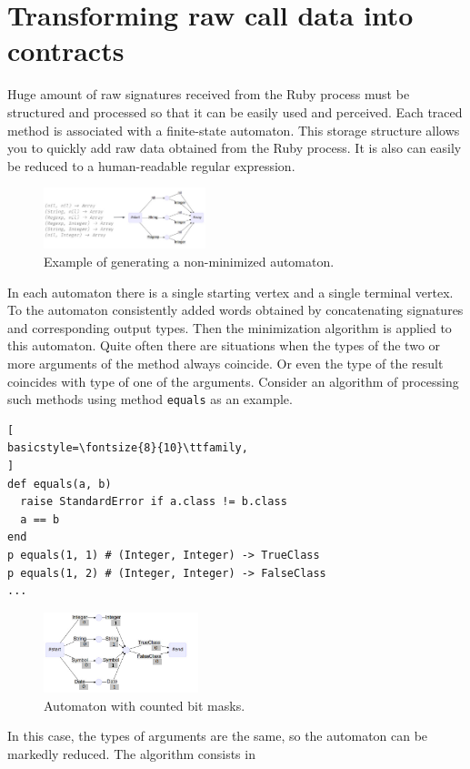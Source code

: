 \documentclass[conference]{IEEEtran}
\begin{document}
\section{Transforming raw call data into contracts}
Huge amount of raw signatures received from the Ruby process must be structured and processed so that it can be easily
used and perceived. Each traced method is associated with a finite-state automaton. This storage structure allows you to
quickly add raw data obtained from the Ruby process. It is also can easily be reduced to a human-readable regular
expression. 
\begin{figure}[h]
    \centering
    \includegraphics[width=0.42\textwidth]{img2}
    \caption{Example of generating a non-minimized automaton.}
\end{figure}
\newpage
In each automaton there is a single starting vertex and a single terminal vertex. To the automaton consistently added
words obtained by concatenating signatures and corresponding output types. Then the minimization
algorithm\cite{dfa_minimisation} is applied to this automaton. Quite often there are situations when the types of the
two or more arguments of the method always coincide. Or even the type of the result coincides with type of one of the
arguments. Consider an algorithm of processing such methods using method \texttt{equals} as an example.
\begin{lstlisting}[
basicstyle=\fontsize{8}{10}\ttfamily,
]
def equals(a, b)
  raise StandardError if a.class != b.class
  a == b
end
p equals(1, 1) # (Integer, Integer) -> TrueClass
p equals(1, 2) # (Integer, Integer) -> FalseClass
...
\end{lstlisting}
\begin{figure}[h]
    \centering
    \includegraphics[width=0.4\textwidth]{img4}
    \caption{Automaton with counted bit masks.}
\end{figure}
In this case, the types of arguments are the same, so the automaton can be markedly reduced. The algorithm consists in
\end{document}
